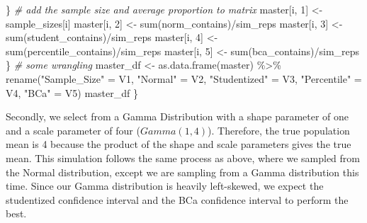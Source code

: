 \documentclass[12pt]{article}
\newenvironment{Shaded}{\begin{snugshade}}{\end{snugshade}}
\newcommand{\CommentTok}[1]{\textcolor[rgb]{0.56,0.35,0.01}{\textit{#1}}}
\newcommand{\DecValTok}[1]{\textcolor[rgb]{0.00,0.00,0.81}{#1}}
\newcommand{\FunctionTok}[1]{\textcolor[rgb]{0.00,0.00,0.00}{#1}}
\newcommand{\NormalTok}[1]{#1}
\newcommand{\OtherTok}[1]{\textcolor[rgb]{0.56,0.35,0.01}{#1}}
\newcommand{\SpecialCharTok}[1]{\textcolor[rgb]{0.00,0.00,0.00}{#1}}
\newcommand{\StringTok}[1]{\textcolor[rgb]{0.31,0.60,0.02}{#1}}
\begin{document}
\begin{Shaded}
\begin{Highlighting}[]
\NormalTok{    \}}
    \CommentTok{\# add the sample size and average proportion to matrix}
\NormalTok{    master[i, }\DecValTok{1}\NormalTok{] }\OtherTok{\textless{}{-}}\NormalTok{ sample\_sizes[i]}
\NormalTok{    master[i, }\DecValTok{2}\NormalTok{] }\OtherTok{\textless{}{-}} \FunctionTok{sum}\NormalTok{(norm\_contains)}\SpecialCharTok{/}\NormalTok{sim\_reps}
\NormalTok{    master[i, }\DecValTok{3}\NormalTok{] }\OtherTok{\textless{}{-}} \FunctionTok{sum}\NormalTok{(student\_contains)}\SpecialCharTok{/}\NormalTok{sim\_reps}
\NormalTok{    master[i, }\DecValTok{4}\NormalTok{] }\OtherTok{\textless{}{-}} \FunctionTok{sum}\NormalTok{(percentile\_contains)}\SpecialCharTok{/}\NormalTok{sim\_reps}
\NormalTok{    master[i, }\DecValTok{5}\NormalTok{] }\OtherTok{\textless{}{-}} \FunctionTok{sum}\NormalTok{(bca\_contains)}\SpecialCharTok{/}\NormalTok{sim\_reps}
\NormalTok{  \}}
  \CommentTok{\# some wrangling}
\NormalTok{  master\_df }\OtherTok{\textless{}{-}} \FunctionTok{as.data.frame}\NormalTok{(master) }\SpecialCharTok{\%\textgreater{}\%} 
      \FunctionTok{rename}\NormalTok{(}\StringTok{"Sample\_Size"} \OtherTok{=}\NormalTok{ V1, }\StringTok{"Normal"} \OtherTok{=}\NormalTok{ V2, }\StringTok{"Studentized"} \OtherTok{=}\NormalTok{ V3, }
             \StringTok{"Percentile"} \OtherTok{=}\NormalTok{ V4, }\StringTok{"BCa"} \OtherTok{=}\NormalTok{ V5) }
\NormalTok{  master\_df}
\NormalTok{\}}
\end{Highlighting}
\end{Shaded}

Secondly, we select from a Gamma Distribution with a shape parameter of
one and a scale parameter of four (\(Gamma(1,4)\)). Therefore, the true
population mean is 4 because the product of the shape and scale
parameters gives the true mean. This simulation follows the same process
as above, where we sampled from the Normal distribution, except we are
sampling from a Gamma distribution this time. Since our Gamma
distribution is heavily left-skewed, we expect the studentized
confidence interval and the BCa confidence interval to perform the best.
\end{document}

